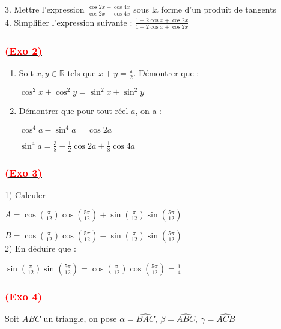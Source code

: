 \documentclass[a4paper,12pt]{article}
\begin{document}
3. Mettre l'expression $\frac{\cos 2x - \cos 4x}{\cos 2x + \cos 4x}$ sous la forme d'un produit de tangents\\

4. Simplifier l'expression suivante : \( \frac{1 - 2\cos x + \cos 2x}{1 + 2\cos x + \cos 2x} \)

\subsubsection*{\underline{\textcolor{red}{ (Exo 2)}}}

\begin{enumerate}
    \item Soit \( x, y \in \mathbb{R} \) tels que \( x + y = \frac{\pi}{2} \). Démontrer que :

          \(\cos^2 x + \cos^2 y = \sin^2 x + \sin^2 y\)

    \item Démontrer que pour tout réel \( a \), on a :

          \( \cos^4 a - \sin^4 a =\cos 2a \)

          \( \sin^4 a = \frac{3}{8} - \frac{1}{2} \cos 2a + \frac{1}{8} \cos 4a \)
\end{enumerate}

\subsubsection*{\underline{\textcolor{red}{ (Exo 3)}}}

1) Calculer

\( A = \cos\left(\frac{\pi}{12}\right)\cos\left(\frac{5\pi}{12}\right) + \sin\left(\frac{\pi}{12}\right)\sin\left(\frac{5\pi}{12}\right) \)

\vspace{0.5cm}

\(B=  \cos\left(\frac{\pi}{12}\right)\cos\left(\frac{5\pi}{12}\right) - \sin\left(\frac{\pi}{12}\right)\sin\left(\frac{5\pi}{12}\right) \)\\

2) En déduire que :

\( \sin\left(\frac{\pi}{12}\right)\sin\left(\frac{5\pi}{12}\right) = \cos\left(\frac{\pi}{12}\right)\cos\left(\frac{5\pi}{12}\right) = \frac{1}{4} \)

\vspace{0.5cm}
\subsubsection*{\underline{\textcolor{red}{ (Exo 4)}}}
Soit \( ABC \) un triangle, on pose \( \alpha = \widehat{BAC},\ \beta = \widehat{ABC},\ \gamma = \widehat{ACB} \)
\end{document}
